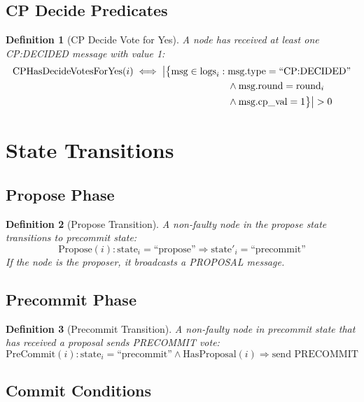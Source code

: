 \documentclass[11pt,a4paper,twoside]{article}
\newtheorem{definition}{Definition}[section]
\begin{document}
\subsection{CP Decide Predicates}

\begin{definition}[CP Decide Vote for Yes]
A node has received at least one CP:DECIDED message with value 1:
\begin{align}
\text{CPHasDecideVotesForYes}(i) \iff \big|\big\{\text{msg} \in \text{logs}_i : {} & \text{msg.type} = \text{``CP:DECIDED''} \notag \\
& \land \text{msg.round} = \text{round}_i \notag \\
& \land \text{msg.cp\_val} = 1\big\}\big| > 0
\end{align}
\end{definition}

\section{State Transitions}

\subsection{Propose Phase}
\begin{definition}[Propose Transition]
A non-faulty node in the propose state transitions to precommit state:
\begin{equation}
\text{Propose}(i) : \text{state}_i = \text{``propose''} \Rightarrow \text{state}'_i = \text{``precommit''}
\end{equation}
If the node is the proposer, it broadcasts a PROPOSAL message.
\end{definition}

\subsection{Precommit Phase}
\begin{definition}[Precommit Transition]
A non-faulty node in precommit state that has received a proposal sends PRECOMMIT vote:
\begin{equation}
\text{PreCommit}(i) : \text{state}_i = \text{``precommit''} \land \text{HasProposal}(i) \Rightarrow \text{send PRECOMMIT}
\end{equation}
\end{definition}

\subsection{Commit Conditions}
\end{document}
